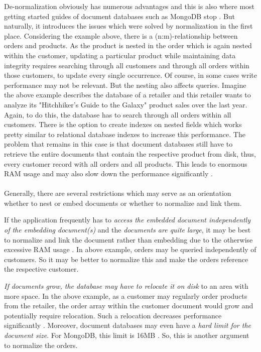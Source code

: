 De-normalization obviously has numerous advantages and this is also where most getting started guides of document databases such as MongoDB stop \cite{MongoDBGettingStarted}. But naturally, it introduces the issues which were solved by normalization in the first place. Considering the example above, there is a (n:m)-relationship between orders and products. As the product is nested in the order which is again nested within the customer, updating a particular product while maintaining data integrity requires searching through all customers and through all orders within those customers, to update every single occurrence. Of course, in some cases write performance may not be relevant. But the nesting also affects queries. Imagine the above example describes the database of a retailer and this retailer wants to analyze its "Hitchhiker's Guide to the Galaxy" product sales over the last year. Again, to do this, the database has to search through all orders within all customers. There is the option to create indexes on nested fields which works pretty similar to relational database indexes to increase this performance. The problem that remains in this case is that document databases still have to retrieve the entire documents that contain the respective product from disk, thus, every customer record with all orders and all products. This leads to enormous RAM usage and may also slow down the performance significantly \cite{MongoDBAppliedDesign}.\\\\
Generally, there are several restrictions which may serve as an orientation whether to nest or embed documents or whether to normalize and link them. \par 
If the application frequently has to \emph{access the embedded document independently of the embedding document(s)} and the \emph{documents are quite large}, it may be best to normalize and link the document rather than embedding due to the otherwise excessive RAM usage \cite{MongoDBAppliedDesign}. In above example, orders may be queried independently of customers. So it may be better to normalize this and make the orders reference the respective customer.\par 
\emph{If documents grow, the database may have to relocate it on disk} to an area with more space. In the above example, as a customer may regularly order products from the retailer, the order array within the customer document would grow and potentially require relocation. Such a relocation decreases performance significantly \cite{MongoDBAppliedDesign}. Moreover, document databases may even have a \emph{hard limit for the document size}. For MongoDB, this limit is 16MB \cite{MongoDBDocumentSizeLimit}. So, this is another argument to normalize the orders.\par 
